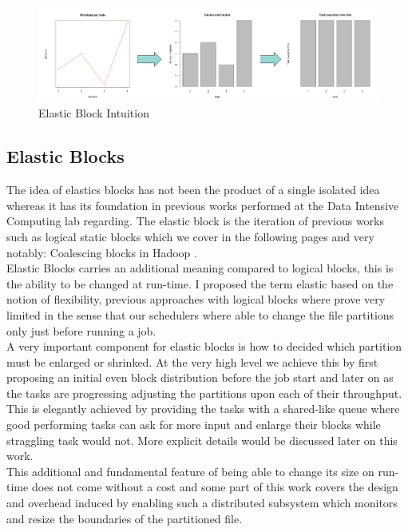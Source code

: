 \label{fig:vdfs_part}
\begin{figure}[H]
    \centering
    \includegraphics[width=1.0\textwidth]{figures/lean_idea.png}
    \caption{Elastic Block Intuition}
\end{figure}

\subsection{Elastic Blocks}

The idea of elastics blocks has not been the product of a single isolated idea
whereas it has its foundation in previous works performed at the Data Intensive
Computing lab regarding. The elastic block is the iteration of previous works
such as logical static blocks which we cover in the following pages and very 
notably: Coalescing blocks in Hadoop \cite{kim2017coalescing}. \\ 

Elastic Blocks carries an additional meaning compared to logical blocks, this is
the ability to be changed at run-time. I proposed the term elastic based on the
notion of flexibility, previous approaches with logical blocks where prove very
limited in the sense that our schedulers where able to change the file partitions 
only just before running a job. \\ 

A very important component for elastic blocks is how to decided which partition must be
enlarged or shrinked. At the very high level we achieve this by first proposing
an initial even block distribution before the job start and later on as the
tasks are progressing adjusting the partitions upon each of their throughput.
This is elegantly achieved by providing the tasks with a shared-like queue where
good performing tasks can ask for more input and enlarge their blocks while
straggling task would not. More explicit details would be discussed later on
this work. \\ 

This additional and fundamental feature of being able to change its size on
run-time does not come without a cost and some part of this work covers the
design and overhead induced by enabling such a distributed subsystem which monitors and
resize the boundaries of the partitioned file.


